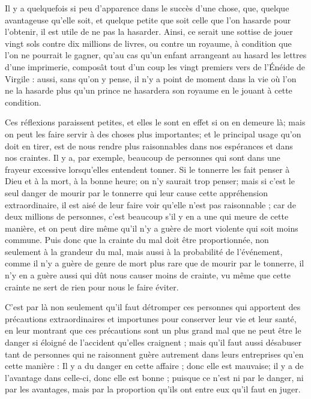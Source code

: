Il y a quelquefois si peu d'apparence dans le succès d'une chose, que, quelque avantageuse qu'elle soit, et quelque petite que soit celle que l'on hasarde pour l'obtenir, il est utile de ne pas la hasarder. Ainsi, ce serait une sottise de jouer vingt sols contre dix millions de livres, ou contre un royaume, à condition que l'on ne pourrait le gagner, qu'au cas qu'un enfant arrangeant au hasard les lettres d'une imprimerie, composât tout d'un coup les vingt premiers vers de l'Énéide de Virgile : aussi, sans qu'on y pense, il n'y a point de moment dans la vie où l'on ne la hasarde plus qu'un prince ne hasardera son royaume en le jouant à cette condition.

Ces réflexions paraissent petites, et elles le sont en effet si on en demeure là; mais on peut les faire servir à des choses plus importantes; et le principal usage qu'on doit en tirer, est de nous rendre plus raisonnables dans nos espérances et dans nos craintes. Il y a, par exemple, beaucoup de personnes qui sont dans une frayeur excessive lorsqu'elles entendent tonner. Si le tonnerre les fait penser à Dieu et à la mort, à la bonne heure; on n'y saurait trop penser; mais si c'est le seul danger de mourir par le tonnerre qui leur cause cette appréhension extraordinaire, il est aisé de leur faire voir qu'elle n'est pas raisonnable ; car de deux millions de personnes, c'est beaucoup s'il y en a une qui meure de cette manière, et on peut dire même qu'il n'y a guère de mort violente qui soit moins commune. Puis donc que la crainte du mal doit être proportionnée, non seulement à la grandeur du mal, mais aussi à la probabilité de l'événement, comme il n'y a guère de genre de mort plus rare que de mourir par le tonnerre, il n'y en a guère aussi qui dût nous causer moins de crainte, vu même que cette crainte ne sert de rien pour nous le faire éviter.

C'est par là non seulement qu'il faut détromper ces personnes qui apportent des précautions extraordinaires et importunes pour conserver leur vie et leur santé, en leur montrant que ces précautions sont un plus grand mal que ne peut être le danger si éloigné de l'accident qu'elles craignent ; mais qu'il faut aussi désabuser tant de personnes qui ne raisonnent guère autrement dans leurs entreprises qu'en cette manière : Il y a du danger en cette affaire ; donc elle est mauvaise; il y a de l'avantage dans celle-ci, donc elle est bonne ; puisque ce n'est ni par le danger, ni par les avantages, mais par la proportion qu'ils ont entre eux qu'il faut en juger.


